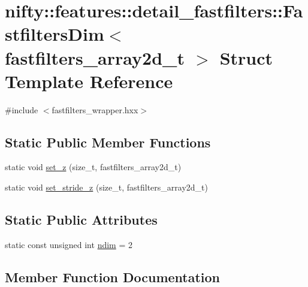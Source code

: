 \hypertarget{structnifty_1_1features_1_1detail__fastfilters_1_1FastfiltersDim_3_01fastfilters__array2d__t_01_4}{}\section{nifty\+:\+:features\+:\+:detail\+\_\+fastfilters\+:\+:Fastfilters\+Dim$<$ fastfilters\+\_\+array2d\+\_\+t $>$ Struct Template Reference}
\label{structnifty_1_1features_1_1detail__fastfilters_1_1FastfiltersDim_3_01fastfilters__array2d__t_01_4}


{\ttfamily \#include $<$fastfilters\+\_\+wrapper.\+hxx$>$}

\subsection*{Static Public Member Functions}
\begin{DoxyCompactItemize}
\item 
static void \hyperlink{structnifty_1_1features_1_1detail__fastfilters_1_1FastfiltersDim_3_01fastfilters__array2d__t_01_4_a0e101cf599880535412ae133a320baaa}{set\+\_\+z} (size\+\_\+t, fastfilters\+\_\+array2d\+\_\+t)
\item 
static void \hyperlink{structnifty_1_1features_1_1detail__fastfilters_1_1FastfiltersDim_3_01fastfilters__array2d__t_01_4_af8d87ecb51f9395aea610bfbdd438c58}{set\+\_\+stride\+\_\+z} (size\+\_\+t, fastfilters\+\_\+array2d\+\_\+t)
\end{DoxyCompactItemize}
\subsection*{Static Public Attributes}
\begin{DoxyCompactItemize}
\item 
static const unsigned int \hyperlink{structnifty_1_1features_1_1detail__fastfilters_1_1FastfiltersDim_3_01fastfilters__array2d__t_01_4_ab0716a0f677fcbc75feb94ff1b05604e}{ndim} = 2
\end{DoxyCompactItemize}


\subsection{Member Function Documentation}
\mbox{\label{structnifty_1_1features_1_1detail__fastfilters_1_1FastfiltersDim_3_01fastfilters__array2d__t_01_4_af8d87ecb51f9395aea610bfbdd438c58}} 
